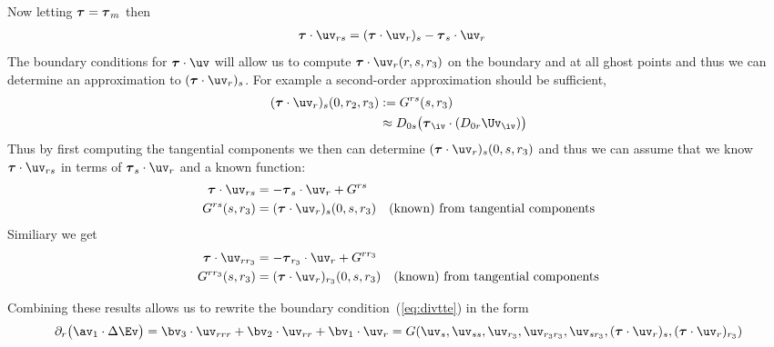 Now letting $\boldsymbol{\tau}=\boldsymbol{\tau}_m$ then
\begin{align*}
   \tauv\cdot\uv_{rs} &= (\tauv\cdot\uv_r)_s - \tauv_s\cdot\uv_r
\end{align*}
The boundary conditions for $\tauv\cdot\uv$ will allow us to compute $\tauv\cdot\uv_r(r,s,\rc)$
on the boundary and at all ghost points  and thus we
can determine an approximation to $(\tauv\cdot\uv_r)_s$. For example a second-order approximation
should be sufficient,
\begin{align*}
  (\tauv\cdot\uv_r)_s(0,\rb,\rc) &:= G^{rs}(s,\rc) \\
                                &\approx D_{0s}\big( \tauv_\iv\cdot (D_{0r}\Uv_\iv) \big)
\end{align*}
Thus by first computing the tangential components we then can determine $(\tauv\cdot\uv_r)_s(0,s,\rc)$ and thus
we can assume that we know $\tauv\cdot\uv_{rs}$ in terms of $\tauv_s\cdot\uv_r$ and a known function:
\begin{align*}
\tauv\cdot\uv_{rs} &= - \tauv_s\cdot\uv_r + G^{rs} \\
                 G^{rs}(s,\rc) &= (\tauv\cdot\uv_r)_s(0,s,\rc) \quad\mbox{(known) from tangential components}
\end{align*}
Similiary we get
\begin{align*}
\tauv\cdot\uv_{r\rc} &= - \tauv_\rc\cdot\uv_r + G^{r\rc} \\
                 G^{r\rc}(s,\rc) &= (\tauv\cdot\uv_r)_\rc(0,s,\rc) \quad\mbox{(known) from tangential components}
\end{align*}

Combining these results allows us to rewrite
the boundary condition~(\ref{eq:divtte}) in the form 
\begin{equation}
  \partial_r\big(\av_1\cdot \Delta\Ev \big) =
    \bv_3\cdot\uv_{rrr} + \bv_2\cdot\uv_{rr} + \bv_1\cdot\uv_{r} 
        = G(\uv_s,\uv_{ss},\uv_\rc,\uv_{\rc\rc},\uv_{s\rc}, (\tauv\cdot\uv_r)_s, (\tauv\cdot\uv_r)_\rc)
\end{equation}



